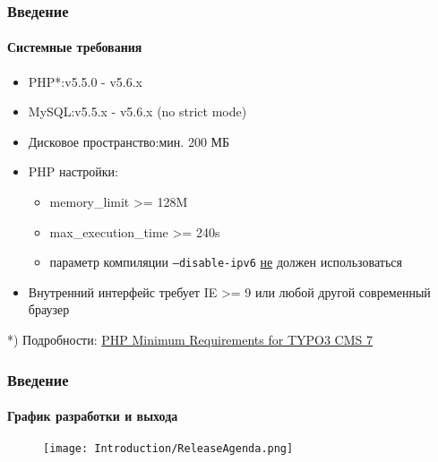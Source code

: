 \begin{frame}[fragile]
	\frametitle{Введение}
	\framesubtitle{Системные требования}

	\begin{itemize}
		\item PHP*:\tabto{4cm}v5.5.0 - v5.6.x
		\item MySQL:\tabto{4cm}v5.5.x - v5.6.x (no strict mode)
		\item Дисковое пространство:\tabto{4cm}мин. 200 МБ
		\item PHP настройки:

			\begin{itemize}
				\item memory\_limit >= 128M
				\item max\_execution\_time >= 240s
				\item параметр компиляции \texttt{--disable-ipv6} \underline{не} должен использоваться
			\end{itemize}

		\item Внутренний интерфейс требует IE >= 9 или любой другой современный браузер

	\end{itemize}

	\vspace{1cm}
	*) Подробности: \href{http://typo3.org/news/article/php-minimum-requirements-for-typo3-cms-7/}{PHP Minimum Requirements for TYPO3 CMS 7}

\end{frame}

\begin{frame}[fragile]
	\frametitle{Введение}
	\framesubtitle{График разработки и выхода}

	\begin{figure}
		\texttt{[image: Introduction/ReleaseAgenda.png]}
	\end{figure}

\end{frame}

